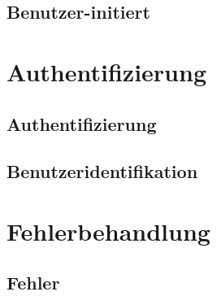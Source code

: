 \subsection*{Benutzer-initiert}



\section{Authentifizierung}
\subsection*{Authentifizierung}


\subsection*{Benutzeridentifikation}


\section{Fehlerbehandlung}
\subsection*{Fehler}


